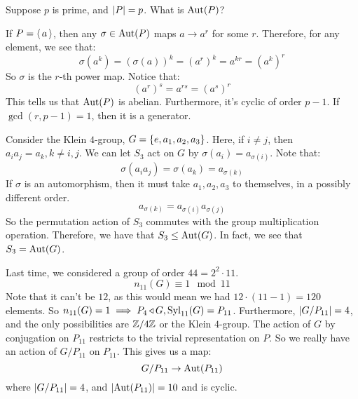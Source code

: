 Suppose $ p $ is prime, and $ \abs{P} = p $. What is $ \operatorname{Aut}(P) $?

If $ P = \operatorname{\langle} a \operatorname{\rangle} $, then any $ \sigma \in \operatorname{Aut}(P) $ maps $ a \rightarrow a^{r} $ for some $ r $.
Therefore, for any element, we see that:
\begin{equation*}
    \sigma(a^{k}) = (\sigma(a))^{k} = (a^{r})^{k} = a^{kr} = (a^{k})^{r}
\end{equation*}
So $ \sigma $ is the $ r $-th power map. Notice that:
\begin{equation*}
    (a^{r})^{s} = a^{rs} = (a^{s})^{r}
\end{equation*}
This tells us that $ \operatorname{Aut}(P) $ is abelian. Furthermore, it's cyclic of order $ p - 1 $.
If $ \gcd(r, p-1) = 1 $, then it is a generator.

\begin{xmp}[source=Primary Source Material]
    Consider the Klein $ 4 $-group, $ G = \left\{{e, a_{1}, a_{2}, a_{3}}\right\} $.
    Here, if $ i \neq j $, then $ a_{i}a_{j} = a_{k}, k \neq i, j $. \vsp
    We can let $ S_{3} $ act on $ G $ by $ \sigma(a_{i}) = a_{\sigma(i)} $.
    Note that:
    \begin{equation*}
        \sigma(a_{i}a_{j}) = \sigma(a_{k}) = a_{\sigma(k)}
    \end{equation*}
    If $ \sigma $ is an automorphism, then it must take $ a_{1}, a_{2}, a_{3} $ to themselves,
    in a possibly different order.
    \begin{equation*}
        a_{\sigma(k)} = a_{\sigma(i)}a_{\sigma(j)}
    \end{equation*}
    So the permutation action of $ S_{3} $ commutes with the group multiplication operation. \vsp
    Therefore, we have that $ S_{3} \leq \operatorname{Aut}(G) $. In fact, we see that $ S_{3} = \operatorname{Aut}(G) $.
\end{xmp}

Last time, we considered a group of order $ 44 = 2^{2} \cdot 11 $.
\begin{equation*}
    n_{11}(G) \equiv 1 \mod 11
\end{equation*}
Note that it can't be $ 12 $, as this would mean we had $ 12 \cdot (11 - 1) = 120 $ elements. \vsp
%
So $ n_{11}(G) = 1 \implies P_{4} \operatorname{\triangleleft} G, \operatorname{Syl}_{11}(G) = P_{11} $.
Furthermore, $ \abs{G/P_{11}} = 4 $, and the only possibilities are $ \mathbb{Z}/4\mathbb{Z} $ or
the Klein $ 4 $-group. \vsp
%
The action of $ G $ by conjugation on $ P_{11} $ restricts to the
trivial representation on $ P $. So we really have an action of $ G/P_{11} $ on $ P_{11} $.
This gives us a map:
\begin{equation*}
    G/P_{11} \rightarrow \operatorname{Aut}(P_{11})
\end{equation*}
where $ \abs{G/P_{11}} = 4 $, and $ \abs{\operatorname{Aut}(P_{11})} = 10 $ and is cyclic.

